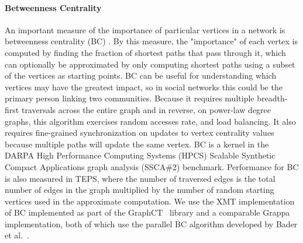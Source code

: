 \paragraph{Betweenness Centrality}
An important measure of the importance of particular vertices in a network is betweenness centrality (BC) \cite{freeman1979centrality}. By this measure, the "importance" of each vertex is computed by finding the fraction of shortest paths that pass through it, which can optionally be approximated by only computing shortest paths using a subset of the vertices as starting points. BC can be useful for understanding which vertices may have the greatest impact, so in social networks this could be the primary person linking two communities. Because it requires multiple breadth-first traversals across the entire graph and in reverse, on power-law degree graphs, this algorithm exercises random accesses rate, and load balancing. It also requires fine-grained synchronization on updates to vertex centrality values because multiple paths will update the same vertex. BC is a kernel in the DARPA High Performance Computing Systems (HPCS) Scalable Synthetic Compact Applications graph analysis (SSCA\#2) benchmark\cite{ssca2}. Performance for BC is also measured in TEPS, where the number of traversed edges is the total number of edges in the graph multiplied by the number of random starting vertices used in the approximate computation. We use the XMT implementation of BC implemented as part of the GraphCT~\cite{GraphCT} library and a comparable Grappa implementation, both of which use the parallel BC algorithm developed by Bader et al.~\cite{bader:bc}.


